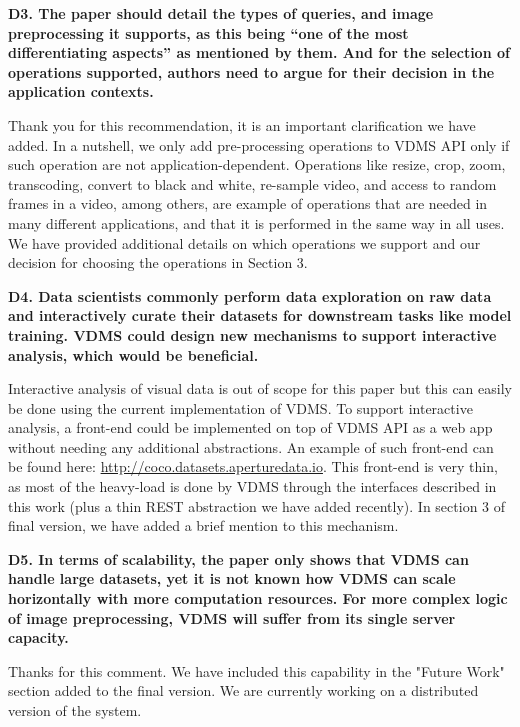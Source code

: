 \documentclass[11pt]{proposalnsf}
\begin{document}
\bigskip
\noindent %
\textbf{
D3. The paper should detail the types of queries, and image preprocessing it supports,
as this being “one of the most differentiating aspects” as mentioned by them.
And for the selection of operations supported, authors need to argue for their
decision in the application contexts.
}\bigskip

Thank you for this recommendation, it is an important clarification we have added.
In a nutshell, we only add pre-processing operations to VDMS API only if such
operation are not application-dependent.
Operations like resize, crop, zoom, transcoding, convert to black and white,
re-sample video, and access to random frames in a video, among others, are
example of operations that are needed in many different applications,
and that it is performed in the same way in all uses.
We have provided additional details on which operations we support and our
decision for choosing the operations in Section 3.

\bigskip
\noindent %
\textbf{
D4. Data scientists commonly perform data exploration on raw data and interactively
curate their datasets for downstream tasks like model training.
VDMS could design new mechanisms to support interactive analysis,
which would be beneficial.
}\bigskip

Interactive analysis of visual data is out of scope for this paper
but this can easily be done using the current implementation of VDMS.
To support interactive analysis, a front-end could be implemented on top of
VDMS API as a web app without needing any additional abstractions.
An example of such front-end can be found here: \url{http://coco.datasets.aperturedata.io}.
This front-end is very thin, as most of the heavy-load is done by VDMS through
the interfaces described in this work
(plus a thin REST abstraction we have added recently).
In section 3 of final version, we have added a brief mention to this mechanism.

\bigskip
\noindent %
\textbf{
D5. In terms of scalability, the paper only shows that VDMS can handle large
datasets, yet it is not known how VDMS can scale horizontally with more
computation resources.
For more complex logic of image preprocessing, VDMS will suffer from its
single server capacity.
}\bigskip

Thanks for this comment.
We have included this capability in the "Future Work" section
added to the final version.
We are currently working on a distributed version of the system.

\newpage
\end{document}
